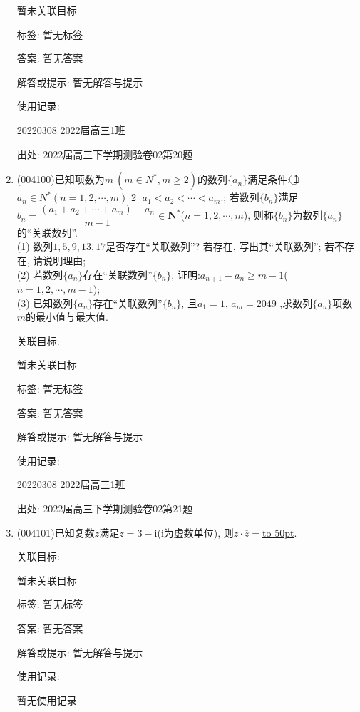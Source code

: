 \documentclass[10pt,a4paper]{article}
\newcommand{\blank}[1]{\underline{\hbox to #1pt{}}}
\begin{document}
\begin{enumerate}[1.]
暂未关联目标



标签: 暂无标签

答案: 暂无答案

解答或提示: 暂无解答与提示

使用记录:

20220308	2022届高三1班			


出处: 2022届高三下学期测验卷02第20题
\item { (004100)}已知项数为$m\ (m\in {N^*},m\ge 2)$的数列$\{ {a_n} \}$满足条件:
\textcircled{1}  $a_n\in {N^*}(n=1,2,\cdots ,m)$    \textcircled{2}  $a_1<a_2<\cdots <a_m$.;
若数列$\{b_n\}$满足 $b_n=\dfrac{(a_1+a_2+\cdots +a_m)-a_n}{m-1}\in \mathbf{N}^*$($n=1,2,\cdots ,m$), 则称$\{b_n\}$为数列$\{a_n\}$的``关联数列''.\\
(1) 数列$1, 5, 9, 13, 17$是否存在``关联数列''? 若存在, 写出其``关联数列''; 若不存在, 请说明理由;\\
(2) 若数列$\{a_n\}$存在``关联数列''$\{b_n\}$, 证明:$a_{n+1}-a_n\ge m-1$($n=1,2,\cdots ,m-1$);\\
(3) 已知数列$\{a_n\}$存在``关联数列''$\{b_n\}$, 且$a_1=1$, $a_m=2049$ ,求数列$\{a_n\}$项数$m$的最小值与最大值.


关联目标:

暂未关联目标



标签: 暂无标签

答案: 暂无答案

解答或提示: 暂无解答与提示

使用记录:

20220308	2022届高三1班			


出处: 2022届高三下学期测验卷02第21题
\item { (004101)}已知复数$z$满足$z=3-\mathrm{i}$($\mathrm{i}$为虚数单位), 则$z\cdot \overline z=$\blank{50}.


关联目标:

暂未关联目标



标签: 暂无标签

答案: 暂无答案

解答或提示: 暂无解答与提示

使用记录:

暂无使用记录



\end{enumerate}
\end{document}
